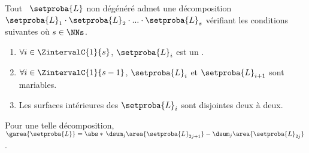 \begin{fact} \label{ngone-trick}
    Tout \ncycle\ $\setproba{L}$ non dégénéré admet une décomposition
    $\setproba{L}_1 \cdot \setproba{L}_2 \cdot ... \cdot \setproba{L}_s$ 
    vérifiant les conditions suivantes où $s \in \NNs$.
    \begin{enumerate}
    	\item $\forall i \in \ZintervalC{1}{s}$, $\setproba{L}_i$ est un .
	
    	\item $\forall i \in \ZintervalC{1}{s-1}$, $\setproba{L}_i$ et $\setproba{L}_{i+1}$ sont mariables.

    	\item Les surfaces intérieures des  $\setproba{L}_i$ sont disjointes deux à deux.
    \end{enumerate}
    
    Pour une telle décomposition, 
    $ \garea{\setproba{L}} 
    = \abs*{\,
    	  \dsum_{j} \area{\setproba{L}_{2j + 1}}  
		- \dsum_{j} \area{\setproba{L}_{2j}}
	  \,}$.
\end{fact}


